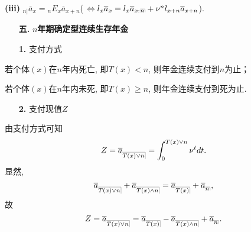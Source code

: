 \documentclass[a4paper,openany, 10pt]{ctexbook}
\makeatletter
\newcommand{\hei}{\CJKfamily{hei}}      %
\DeclareRobustCommand{\annu}[1]{_{%
    \def\arraystretch{0}%
    \setlength\arraycolsep{1pt}%
    \setlength\arrayrulewidth{.2pt}%
    \begin{array}[b]{@{}c|}\hline
        \\[\arraycolsep]%
        \scriptstyle #1%
    \end{array}%
}}
\makeatother
\begin{document}
{\rm\bf(iii)} $_{n|}\overline{a}_{x}={}_nE_x\overline{a}_{x+n}$(
$\Leftrightarrow l_x\overline{a}_{x}=l_x\overline{a}_{x:}{}\annu{n}+\nu^nl_{x+n}
\overline{a}_{x+n}$).


\begin{itemize}
    \item[{\bf\hei 五.}]{\bf\hei $n$年期确定型连续生存年金}
\end{itemize}

\begin{itemize}
    \item[{\bf\hei 1.}] 支付方式
\end{itemize}

若个体$(x)$在$n$年内死亡, 即$T(x)<n$, 则年金连续支付到$n$为止；

若个体$(x)$在$n$年内未死, 即$T(x)\ge n$, 则年金连续支付到死为止.

\begin{itemize}
    \item[{\bf\hei 2.}] 支付现值$Z$
\end{itemize}
由支付方式可知
$$Z=\overline {a}_{\annu{T(x)\lor n}}=\int_0^{{T(x)\lor n}}\nu^tdt.$$
显然, $$\overline {a}_{\annu{T(x)\lor n}}+\overline {a}_{\annu{T(x)\land n}}=\overline {a}_{\annu{T(x)}}+\overline {a}_{\annu{n}},$$
故$$Z=\overline {a}_{\annu{T(x)\lor n}}=\overline {a}_{\annu{T(x)}}-\overline {a}_{\annu{T(x)\land n}}+\overline {a}_{\annu{n}}.$$
\end{document}
